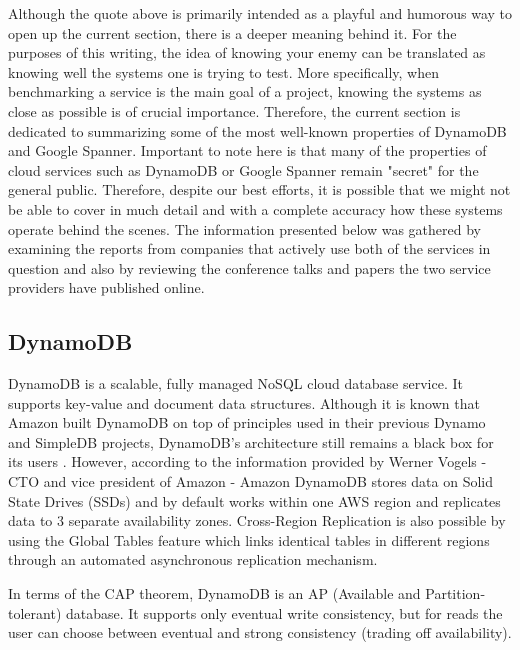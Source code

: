 \documentclass[letterpaper, 10 pt, conference]{ieeeconf}  %
\begin{document}
Although the quote above is primarily intended as a playful and humorous way to open up the current section, there is a deeper meaning behind it. For the purposes of this writing, the idea of knowing your enemy can be translated as knowing well the systems one is trying to test. More specifically, when benchmarking a service is the main goal of a project, knowing the systems as close as possible is of crucial importance. Therefore, the current section is dedicated to summarizing some of the most well-known properties of DynamoDB and Google Spanner. Important to note here is that many of the properties of cloud services such as DynamoDB or Google Spanner remain "secret" for the general public. Therefore, despite our best efforts, it is possible that we might not be able to cover in much detail and with a complete accuracy how these systems operate behind the scenes. The information presented below was gathered by examining the reports from companies that actively use both of the services in question and also by reviewing the conference talks and papers the two service providers have published online.

\subsection{DynamoDB}
DynamoDB is a scalable, fully managed NoSQL cloud database service. It supports key-value and document data structures. Although it is known that Amazon built DynamoDB on top of principles used in their previous Dynamo \cite{DeCandia:2007:DAH:1323293.1294281} and SimpleDB projects, DynamoDB's architecture still remains a black box for its users \cite{Allthings}. However, according to the information provided by Werner Vogels \cite{Allthings} - CTO and vice president of Amazon - Amazon DynamoDB stores data on Solid State Drives (SSDs) and by default works within one AWS region and replicates data to 3 separate availability zones. Cross-Region Replication is also possible by using the Global Tables feature which links identical tables in different regions through an automated asynchronous replication mechanism. \par
In terms of the CAP theorem, DynamoDB is an AP (Available and Partition-tolerant) database. It supports only eventual write consistency, but for reads the user can choose between eventual and strong consistency (trading off availability). 
\end{document}
